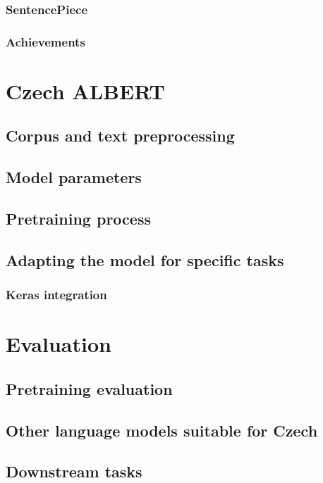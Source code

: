 \documentclass[
  digital, %
  table,   %
  twoside, %
  lof,     %
  lot,     %
]{fithesis3}
\begin{document}
\subsection{SentencePiece}

\subsection{Achievements}


\chapter{Czech ALBERT}
\section{Corpus and text preprocessing}
\section{Model parameters}
\section{Pretraining process}
\section{Adapting the model for specific tasks}
\subsection{Keras integration}


\chapter{Evaluation}
\section{Pretraining evaluation}
\section{Other language models suitable for Czech}
\section{Downstream tasks}
\end{document}
